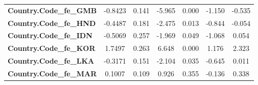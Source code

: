 \begin{center}
\begin{tabular}{lcccccc}
\textbf{Country.Code\_fe\_GMB}                                     &      -0.8423  &        0.141     &    -5.965  &         0.000        &       -1.150    &       -0.535     \\
\textbf{Country.Code\_fe\_HND}                                     &      -0.4487  &        0.181     &    -2.475  &         0.013        &       -0.844    &       -0.054     \\
\textbf{Country.Code\_fe\_IDN}                                     &      -0.5069  &        0.257     &    -1.969  &         0.049        &       -1.068    &        0.054     \\
\textbf{Country.Code\_fe\_KOR}                                     &       1.7497  &        0.263     &     6.648  &         0.000        &        1.176    &        2.323     \\
\textbf{Country.Code\_fe\_LKA}                                     &      -0.3171  &        0.151     &    -2.104  &         0.035        &       -0.645    &        0.011     \\
\textbf{Country.Code\_fe\_MAR}                                     &       0.1007  &        0.109     &     0.926  &         0.355        &       -0.136    &        0.338     \\
\bottomrule
\end{tabular}
\end{center}